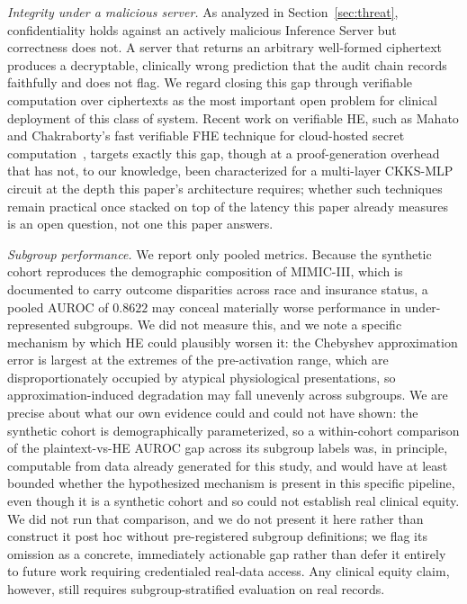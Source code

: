 \documentclass[journal,compsoc]{IEEEtran}
\begin{document}
\emph{Integrity under a malicious server.} As analyzed in
Section~\ref{sec:threat}, confidentiality holds against an actively malicious
Inference Server but correctness does not. A server that returns an arbitrary
well-formed ciphertext produces a decryptable, clinically wrong prediction that
the audit chain records faithfully and does not flag. We regard closing this
gap through verifiable computation over ciphertexts as the most important open
problem for clinical deployment of this class of system. Recent work on
verifiable HE, such as Mahato and Chakraborty's fast verifiable FHE technique
for cloud-hosted secret computation~\cite{mahato2025verifiable}, targets
exactly this gap, though at a proof-generation overhead that has not, to our
knowledge, been characterized for a multi-layer CKKS-MLP circuit at the depth
this paper's architecture requires; whether such techniques remain practical
once stacked on top of the latency this paper already measures is an open
question, not one this paper answers.

\emph{Subgroup performance.} We report only pooled metrics. Because the
synthetic cohort reproduces the demographic composition of MIMIC-III, which is
documented to carry outcome disparities across race and insurance status, a
pooled AUROC of $0.8622$ may conceal materially worse performance in
under-represented subgroups. We did not measure this, and we note a specific
mechanism by which HE could plausibly worsen it: the Chebyshev approximation
error is largest at the extremes of the pre-activation range, which are
disproportionately occupied by atypical physiological presentations, so
approximation-induced degradation may fall unevenly across subgroups. We are
precise about what our own evidence could and could not have shown: the
synthetic cohort is demographically parameterized, so a within-cohort
comparison of the plaintext-vs-HE AUROC gap across its subgroup labels was, in
principle, computable from data already generated for this study, and would
have at least bounded whether the hypothesized mechanism is present in this
specific pipeline, even though it is a synthetic cohort and so could not
establish real clinical equity. We did not run that comparison, and we do not
present it here rather than construct it post hoc without pre-registered
subgroup definitions; we flag its omission as a concrete, immediately
actionable gap rather than defer it entirely to future work requiring
credentialed real-data access. Any clinical equity claim, however, still
requires subgroup-stratified evaluation on real records.
\end{document}
